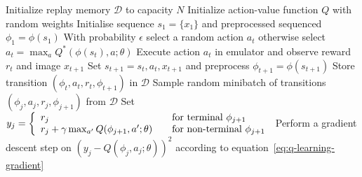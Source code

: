 \begin{algorithm}[t]
\begin{algorithmic}
\State Initialize replay memory $\mathcal{D}$ to capacity $N$
\State Initialize action-value function $Q$ with random weights
\State Initialise sequence $s_1 = \{x_1\}$ and preprocessed sequenced $\phi_1 = \phi(s_1)$
	\State With probability $\epsilon$ select a random action $a_t$
	\State otherwise select $a_t = \max_{a} Q^*(\phi(s_t), a; \theta)$
	\State Execute action $a_t$ in emulator and observe reward $r_t$ and image $x_{t+1}$
	\State Set $s_{t+1} = s_t,a_t,x_{t+1}$ and preprocess $\phi_{t+1} = \phi(s_{t+1})$
	\State Store transition $\left(\phi_t,a_t,r_t,\phi_{t+1}\right)$ in $\mathcal{D}$
	\State Sample random minibatch of transitions $\left(\phi_j,a_j,r_j,\phi_{j+1}\right)$ from $\mathcal{D}$
	\State Set
	$y_j =
    \left\{
    \begin{array}{l l}
      r_j  \quad & \text{for terminal } \phi_{j+1}\\
      r_j + \gamma \max_{a'} Q(\phi_{j+1}, a'; \theta) \quad & \text{for non-terminal } \phi_{j+1}
    \end{array} \right.$
	\State Perform a gradient descent step on $\left(y_j - Q(\phi_j, a_j; \theta) \right)^2$ according to equation~\ref{eq:q-learning-gradient}
\EndFor
\EndFor
\end{algorithmic}
\caption{Deep Q-learning with Experience Replay}
\label{alg}
\end{algorithm}


